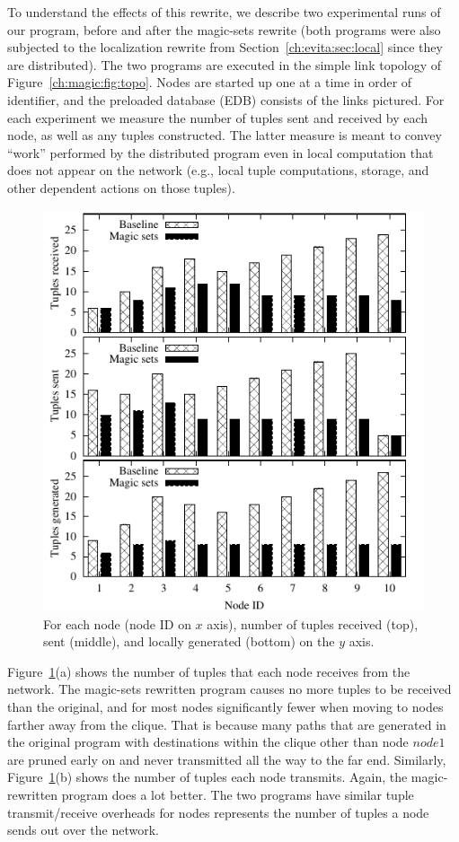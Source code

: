 To understand the effects of this rewrite, we describe two experimental runs of
our program, before and after the magic-sets rewrite (both programs were also
subjected to the localization rewrite from Section~\ref{ch:evita:sec:local}
since they are distributed).  The two programs are executed in the simple link
topology of Figure~\ref{ch:magic:fig:topo}.  Nodes are started up one at a time
in order of identifier, and the preloaded database (EDB) consists of the links
pictured.  For each experiment we measure the number of tuples sent and
received by each node, as well as any  tuples constructed.  The latter
measure is meant to convey ``work'' performed by the distributed program even
in local computation that does not appear on the network (e.g., local tuple
computations, storage, and other dependent actions on those tuples).

\begin{figure}
\centering
\includegraphics{figures/magicNumbers}
\ssp
\caption{For each node (node ID on $x$ axis), number of tuples received
  (top), sent (middle), and locally generated (bottom) on the $y$ axis.}
\label{ch:evita:fig:magicresults}
\end{figure}

Figure~\ref{ch:evita:fig:magicresults}(a) shows the number of tuples that each
node receives from the network.  The magic-sets rewritten program causes no
more tuples to be received than the original, and for most nodes significantly
fewer when moving to nodes farther away from the clique.  That is because many
paths that are generated in the original program with destinations within the
clique other than node $node1$ are pruned early on and never transmitted all the
way to the far end.  Similarly, Figure~\ref{ch:evita:fig:magicresults}(b) shows
the number of tuples each node transmits.  Again, the magic-rewritten program
does a lot better.  The two programs have similar tuple transmit/receive
overheads for nodes represents the number of tuples a node sends out over the
network.  

